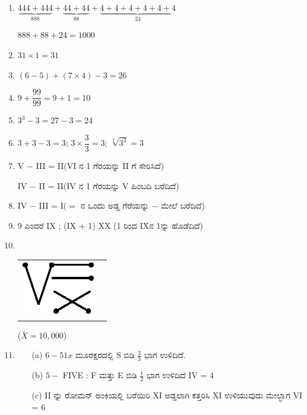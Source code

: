 \begin{enumerate}
\itemsep=5pt

\item $\underbrace{444 + 444}_{888} + \underbrace{44 + 44}_{88} + \underbrace{4 + 4 + 4 + 4 + 4 + 4}_{24}$

$888 + 88 + 24 = 1000$

\item $31 \times 1 = 31$

\item $(6- 5) + (7 \times 4) - 3 = 26$

\item $9 + \dfrac{99}{99} = 9 + 1 = 10$

\item $3^{3} - 3 = 27 - 3 = 24$

\item $3 + 3 - 3 = 3$; $3 \times \dfrac{3}{3} = 3$; $\sqrt[3]{3^{3}} = 3$

\item V $-$ III = II\quad (VI ನ 1 ಗೆರಯನ್ನು II ಗೆ ಸೇರಿಸಿದೆ)

IV $-$ II = II\quad (IV ನ 1 ಗೆರಯನ್ನು  V ಹಿಂಬದಿ ಬರೆದಿದೆ)

\item IV $-$ III = I\quad ($=$ ನ ಒಂದು ಅಡ್ಡ ಗೆರೆಯನ್ನು $-$ ಮೇಲೆ ಬರೆದಿದೆ)

\item 9 ಎಂದರೆ IX ; (IX + 1) XX (1 ರಿಂದ IXನ 1ನ್ನು ಹೊಡೆದಿದೆ)

\item 
~

\begin{tabular}[t]{cc}
\includegraphics[scale =0.8]{images/chap4/ans10.eps} & \raisebox{.5cm}{= $\sqrt{10,000} = 100$}
\end{tabular}

($\overline{X} = 10,000$)

\item 
\begin{itemize}
\item[(a)] $6 - 51x$ ಮೂರಕ್ಷರದಲ್ಲಿ S ಬಿಡಿ $\frac{2}{3}$ ಭಾಗ ಉಳಿದಿದೆ. 
\item[(b)] $5 -$ FIVE : F ಮತ್ತು E ಬಿಡಿ $\frac{1}{2}$ ಭಾಗ ಉಳಿದಿದೆ  IV = 4
\item[(c)] II ನ್ನು ರೋಮನ್ ಅಂಕಿಯಲ್ಲಿ ಬರೆಯಿರಿ XI ಅಡ್ಡಲಾಗಿ ಕತ್ತರಿಸಿ XI ಉಳಿಯುವುದು ಮೇಲ್ಭಾಗ VI = 6
\end{itemize}


\end{enumerate}
